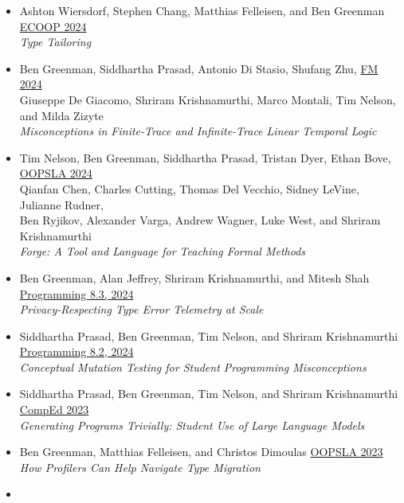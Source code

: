 \documentclass[11pt]{article}
\begin{document}
\begin{itemize}
\item
  Ashton Wiersdorf, Stephen Chang, Matthias Felleisen, and Ben Greenman \hfill \href{https://2024.ecoop.org/}{ECOOP 2024} \\
  \emph{Type Tailoring}
\item
  Ben Greenman, Siddhartha Prasad, Antonio Di Stasio, Shufang Zhu, \hfill \href{https://www.fm24.polimi.it/}{FM 2024} \\
  Giuseppe De Giacomo, Shriram Krishnamurthi, Marco Montali, Tim Nelson, and Milda Zizyte \\
  \emph{Misconceptions in Finite-Trace and Infinite-Trace Linear Temporal Logic}
\item
  {Tim Nelson}, {Ben Greenman}, {Siddhartha Prasad}, {Tristan Dyer}, {Ethan Bove},
    \hfill \href{https://2024.splashcon.org/track/splash-2024-oopsla}{OOPSLA 2024} \\
  {Qianfan Chen}, {Charles Cutting}, {Thomas Del Vecchio}, {Sidney LeVine}, {Julianne Rudner}, \\
  {Ben Ryjikov}, {Alexander Varga}, {Andrew Wagner}, {Luke West}, and {Shriram Krishnamurthi} \\
  \emph{Forge: A Tool and Language for Teaching Formal Methods}
\item
  Ben Greenman, Alan Jeffrey, Shriram Krishnamurthi, and Mitesh Shah \hfill \href{https://2023.programming-conference.org/}{Programming 8.3, 2024} \\
  \emph{Privacy-Respecting Type Error Telemetry at Scale}
\item
  Siddhartha Prasad, Ben Greenman, Tim Nelson, and Shriram Krishnamurthi \hfill \href{https://2023.programming-conference.org/}{Programming 8.2, 2024} \\
  \emph{Conceptual Mutation Testing for Student Programming Misconceptions}
\item
  Siddhartha Prasad, Ben Greenman, Tim Nelson, and Shriram Krishnamurthi \hfill \href{https://comped.acm.org/call-for-participation-2/}{CompEd 2023} \\
  \emph{Generating Programs Trivially: Student Use of Large Language Models}
\item
  Ben Greenman, Matthias Felleisen, and Christos Dimoulas \hfill \href{https://2023.splashcon.org/track/splash-2023-oopsla}{OOPSLA 2023} \\
  \emph{How Profilers Can Help Navigate Type Migration}
\item

\end{itemize}
\end{document}
